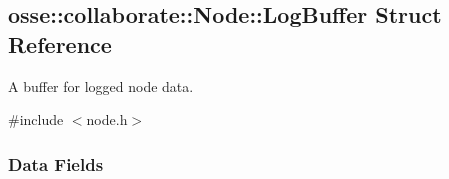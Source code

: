 \hypertarget{structosse_1_1collaborate_1_1_node_1_1_log_buffer}{}\subsection{osse\+:\+:collaborate\+:\+:Node\+:\+:Log\+Buffer Struct Reference}
\label{structosse_1_1collaborate_1_1_node_1_1_log_buffer}


A buffer for logged node data.  




{\ttfamily \#include $<$node.\+h$>$}

\subsubsection*{Data Fields}
